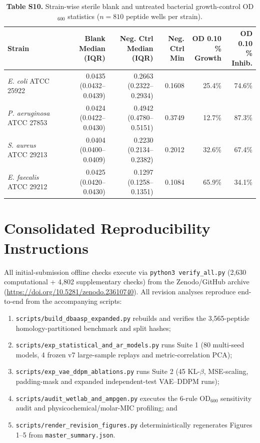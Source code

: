 \documentclass[11pt,a4paper]{article}
\newcommand{\rev}[1]{#1}
\begin{document}
\begin{table}[H]
\centering\footnotesize\setlength{\tabcolsep}{4.0pt}
\caption*{\rev{\textbf{Table S10.} Strain-wise sterile blank and untreated bacterial growth-control OD$_{600}$ statistics ($n=810$ peptide wells per strain).}}
\begin{tabular}{lrrrrr}
\toprule
Strain & \shortstack[r]{Blank Median\\(IQR)} & \shortstack[r]{Neg. Ctrl Median\\(IQR)} & \shortstack[r]{Neg. Ctrl\\Min} & \shortstack[r]{OD 0.10\\\% Growth} & \shortstack[r]{OD 0.10\\\% Inhib.} \\
\midrule
\textit{E. coli} ATCC 25922 & 0.0435 (0.0432--0.0439) & 0.2663 (0.2322--0.2934) & 0.1608 & 25.4\% & 74.6\% \\
\textit{P. aeruginosa} ATCC 27853 & 0.0424 (0.0422--0.0430) & 0.4942 (0.4780--0.5151) & 0.3749 & 12.7\% & 87.3\% \\
\textit{S. aureus} ATCC 29213 & 0.0404 (0.0400--0.0409) & 0.2230 (0.2134--0.2382) & 0.2012 & 32.6\% & 67.4\% \\
\textit{E. faecalis} ATCC 29212 & 0.0425 (0.0420--0.0430) & 0.1297 (0.1258--0.1351) & 0.1084 & 65.9\% & 34.1\% \\
\bottomrule
\end{tabular}
\end{table}

\section*{Consolidated Reproducibility Instructions}
All initial-submission offline checks execute via {\small\texttt{python3 verify\_all.py}} (2,630 computational + 4,802 supplementary checks) from the Zenodo/GitHub archive (\url{https://doi.org/10.5281/zenodo.23610740}). \rev{All revision analyses reproduce end-to-end from the accompanying scripts:}
\begin{enumerate}[leftmargin=1.8em,itemsep=2pt]\raggedright
\item \rev{{\small\texttt{scripts/build\_dbaasp\_expanded.py}} rebuilds and verifies the 3,565-peptide homology-partitioned benchmark and split hashes;}
\item \rev{{\small\texttt{scripts/exp\_statistical\_and\_ar\_models.py}} runs Suite 1 (80 multi-seed models, 4 frozen v7 large-sample replays and metric-correlation PCA);}
\item \rev{{\small\texttt{scripts/exp\_vae\_ddpm\_ablations.py}} runs Suite 2 (45 KL-$\beta$, MSE-scaling, padding-mask and expanded independent-test VAE--DDPM runs);}
\item \rev{{\small\texttt{scripts/audit\_wetlab\_and\_ampgen.py}} executes the 6-rule OD$_{600}$ sensitivity audit and physicochemical/molar-MIC profiling; and}
\item \rev{{\small\texttt{scripts/render\_revision\_figures.py}} deterministically regenerates Figures 1--5 from {\small\texttt{master\_summary.json}}.}
\end{enumerate}
\end{document}

